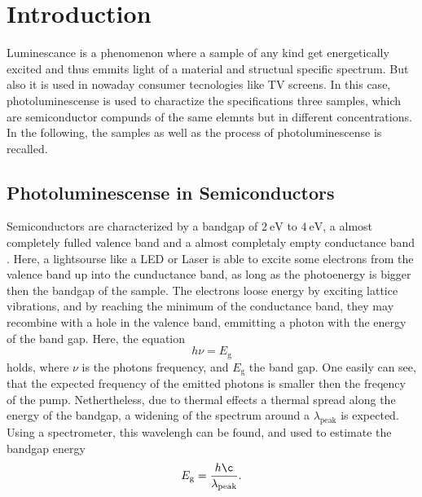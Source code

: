 \section{Introduction}
\label{sec:Introduction}

Luminescance is a phenomenon where a sample of any kind get energetically excited and thus emmits light of a material and structual specific spectrum.
But also it is used in nowaday consumer tecnologies like TV screens. 
In this case, photoluminescense is used to charactize the specifications three samples, which are semiconductor compunds of the same elemnts but in different concentrations.
In the following, the samples as well as the process of photoluminescense is recalled.

\subsection{Photoluminescense in Semiconductors}
\label{sec:PLS}

Semiconductors are characterized by a bandgap of $\SI{2}{\eV}$ to $\SI{4}{\eV}$, a almost completely fulled valence band and a almost completaly empty conductance band \cite[391]{festkorperphysik}.
Here, a lightsourse like a LED or Laser is able to excite some electrons from the valence band up into the cunductance band, as long as the photoenergy is bigger then the bandgap of the sample.
The electrons loose energy by exciting lattice vibrations, and by reaching the minimum of the conductance band, they may recombine with a hole in the valence band, emmitting a photon with the energy of the band gap.
Here, the equation
\begin{equation}
    h\nu = E_{\text{g}}
\end{equation}
holds, where $\nu$ is the photons frequency, and $E_\text{g}$ the band gap.
One easily can see, that the expected frequency of the emitted photons is smaller then the freqency of the pump. 
Nethertheless, due to thermal effects a thermal spread along the energy of the bandgap, a widening of the spectrum around a $\lambda_\text{peak}$ is expected.
Using a spectrometer, this wavelengh can be found, and used to estimate the bandgap energy
\begin{equation}
    E_{\text{g}} = \frac{h\c}{\lambda_\text{peak}}.
\end{equation}

